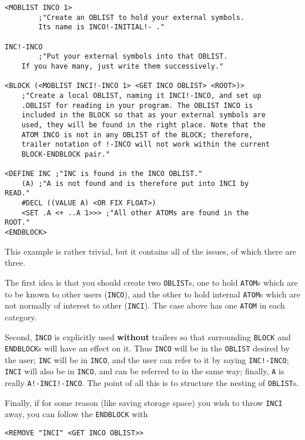 \documentclass[a4paper]{scrbook}
\begin{document}
\begin{verbatim}
<MOBLIST INCO 1>
        ;"Create an OBLIST to hold your external symbols.
        Its name is INCO!-INITIAL!- ."

INC!-INCO
        ;"Put your external symbols into that OBLIST.
    If you have many, just write them successively."

<BLOCK (<MOBLIST INCI!-INCO 1> <GET INCO OBLIST> <ROOT>)>
    ;"Create a local OBLIST, naming it INCI!-INCO, and set up
    .OBLIST for reading in your program. The OBLIST INCO is
    included in the BLOCK so that as your external symbols are
    used, they will be found in the right place. Note that the
    ATOM INCO is not in any OBLIST of the BLOCK; therefore,
    trailer notation of !-INCO will not work within the current
    BLOCK-ENDBLOCK pair."

<DEFINE INC ;"INC is found in the INCO OBLIST."
    (A) ;"A is not found and is therefore put into INCI by
READ."
    #DECL ((VALUE A) <OR FIX FLOAT>)
    <SET .A <+ ..A 1>>> ;"All other ATOMs are found in the
ROOT."
<ENDBLOCK>
\end{verbatim}

This example is rather trivial, but it contains all of the issues, of which there are three.

The first idea is that you should create two \texttt{OBLIST}s, one to hold \texttt{ATOM}s which are to be known to other
users (\texttt{INCO}), and the other to hold internal \texttt{ATOM}s which are not normally of interest to other
(\texttt{INCI}). The case above has one \texttt{ATOM} in each category.

Second, \texttt{INCO} is explicitly used \textbf{without} trailers so that surrounding \texttt{BLOCK} and
\texttt{ENDBLOCK}s will have an effect on it. Thus \texttt{INCO} will be in the \texttt{OBLIST} desired by the user;
\texttt{INC} will be in \texttt{INCO}, and the user can refer to it by saying \texttt{INC!-INCO}; \texttt{INCI} will also
be in \texttt{INCO}, and can be referred to in the same way; finally, \texttt{A} is really \texttt{A!-INCI!-INCO}. The
point of all this is to structure the nesting of \texttt{OBLIST}s.

Finally, if for some reason (like saving storage space) you wish to throw \texttt{INCI} away, you can follow the
\texttt{ENDBLOCK} with

\begin{verbatim}
<REMOVE "INCI" <GET INCO OBLIST>>
\end{verbatim}
\end{document}
